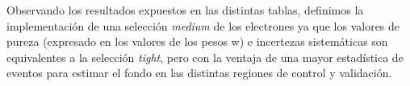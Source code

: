 Observando los resultados expuestos en las distintas tablas, definimos la implementación de una selección \textit{medium} de los electrones ya que los valores de pureza (expresado en los valores de los pesos w) e incertezas sistemáticas son equivalentes a la selección \textit{tight}, pero con la ventaja de una mayor estadística de eventos para estimar el fondo en las distintas regiones de control y validación.


